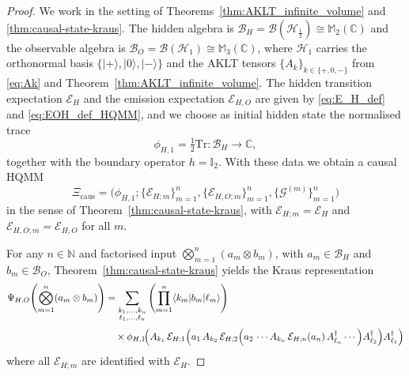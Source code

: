 \documentclass[11pt,a4paper]{article}
\def\Tr{\mathrm{Tr}}
\begin{document}
\begin{proof}
We work in the setting of Theorems~\ref{thm:AKLT_infinite_volume} and \ref{thm:causal-state-kraus}. The hidden algebra is $\mathcal{B}_H=\mathcal{B}(\mathcal{H}_{\frac{1}{2}})\cong\mathbb{M}_2(\mathbb{C})$ and the observable algebra is $\mathcal{B}_O=\mathcal{B}(\mathcal{H}_{1})\cong\mathbb{M}_3(\mathbb{C})$, where $\mathcal{H}_{1}$ carries the orthonormal basis $\{|+\rangle,|0\rangle,|-\rangle\}$ and the AKLT tensors $\{A_k\}_{k\in\{+,0,-\}}$ from \eqref{eq:Ak} and Theorem~\ref{thm:AKLT_infinite_volume}.  The hidden transition expectation $\mathcal{E}_H$ and the emission expectation $\mathcal{E}_{H,O}$ are given by \eqref{eq:E_H_def} and \eqref{eq:EOH_def_HQMM}, and we choose as initial hidden state the normalised trace
\[
\phi_{H,1}=\tfrac{1}{2}\Tr:\mathcal{B}_H\to\mathbb{C},
\]
together with the boundary operator $h=\mathbb{I}_2$. With these data we obtain a causal HQMM
\[
\Xi_{\mathrm{caus}}
=
\bigl(\phi_{H,1};\{\mathcal{E}_{H;m}\}_{m=1}^{n},\{\mathcal{E}_{H,O;m}\}_{m=1}^{n},\{\mathcal{G}^{(m)}\}_{m=1}^{n}\bigr)
\]
in the sense of Theorem~\ref{thm:causal-state-kraus}, with $\mathcal{E}_{H;m}=\mathcal{E}_H$ and $\mathcal{E}_{H,O;m}=\mathcal{E}_{H,O}$ for all $m$.

For any $n\in\mathbb{N}$ and factorised input $\bigotimes_{m=1}^n(a_m\otimes b_m)$, with $a_m\in\mathcal{B}_H$ and $b_m\in\mathcal{B}_O$, Theorem~\ref{thm:causal-state-kraus} yields the Kraus representation
\begin{align}
\Psi_{H,O}\!\left(\bigotimes_{m=1}^n (a_m\otimes b_m)\right)
&=
\sum_{\substack{k_1,\dots,k_n\\ \ell_1,\dots,\ell_n}}
\left(\prod_{m=1}^n \langle k_m|b_m|\ell_m\rangle\right)
\nonumber\\[0.3em]
&\quad\times
\phi_{H,1}\!\Bigl(
A_{k_1}\,
\mathcal{E}_{H;1}\Bigl(
a_1\,
A_{k_2}\,
\mathcal{E}_{H;2}\Bigl(
a_2\,
\cdots
A_{k_n}\,\mathcal{E}_{H;n}(a_n)\,
A_{\ell_n}^\dagger
\cdots
\Bigr)
A_{\ell_2}^\dagger
\Bigr)
A_{\ell_1}^\dagger
\Bigr)
\label{eq:psi-explicit-compact2-proof}
\end{align}
where all $\mathcal{E}_{H;m}$ are identified with $\mathcal{E}_H$.


\end{proof}
\end{document}
